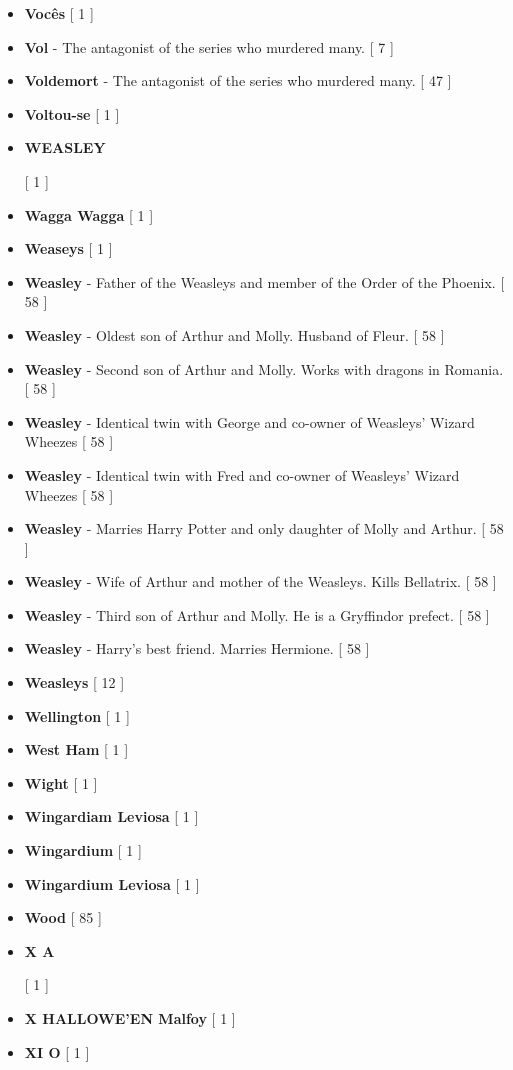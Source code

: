 \documentclass[a4paper]{article}
\begin{document}
\begin{itemize}
	\item \textbf{Vocês} [ 1 ]
	\item \textbf{Vol} - The antagonist of the series who murdered many. [ 7 ]
	\item \textbf{Voldemort} - The antagonist of the series who murdered many. [ 47 ]
	\item \textbf{Voltou-se} [ 1 ]
	\item \hypertarget{W}{\textbf{WEASLEY}} [ 1 ]
	\item \textbf{Wagga Wagga} [ 1 ]
	\item \textbf{Weaseys} [ 1 ]
	\item \textbf{Weasley} - Father of the Weasleys and member of the Order of the Phoenix. [ 58 ]
	\item \textbf{Weasley} - Oldest son of Arthur and Molly. Husband of Fleur.  [ 58 ]
	\item \textbf{Weasley} - Second son of Arthur and Molly. Works with dragons in Romania. [ 58 ]
	\item \textbf{Weasley} - Identical twin with George and co-owner of Weasleys' Wizard Wheezes [ 58 ]
	\item \textbf{Weasley} - Identical twin with Fred and co-owner of Weasleys' Wizard Wheezes [ 58 ]
	\item \textbf{Weasley} - Marries Harry Potter and only daughter of Molly and Arthur. [ 58 ]
	\item \textbf{Weasley} - Wife of Arthur and mother of the Weasleys. Kills Bellatrix. [ 58 ]
	\item \textbf{Weasley} - Third son of Arthur and Molly. He is a Gryffindor prefect. [ 58 ]
	\item \textbf{Weasley} - Harry's best friend. Marries Hermione. [ 58 ]
	\item \textbf{Weasleys} [ 12 ]
	\item \textbf{Wellington} [ 1 ]
	\item \textbf{West Ham} [ 1 ]
	\item \textbf{Wight} [ 1 ]
	\item \textbf{Wingardiam Leviosa} [ 1 ]
	\item \textbf{Wingardium} [ 1 ]
	\item \textbf{Wingardium Leviosa} [ 1 ]
	\item \textbf{Wood} [ 85 ]
	\item \hypertarget{X}{\textbf{X A}} [ 1 ]
	\item \textbf{X HALLOWE'EN Malfoy} [ 1 ]
	\item \textbf{XI O} [ 1 ]

\end{itemize}
\end{document}
